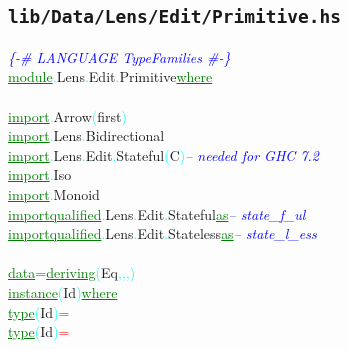 \subsection{\texttt{lib/Data/Lens/Edit/Primitive.hs}}
\label{mod:Data.Lens.Edit.Primitive}
\textcolor{blue}{{\it{}\{-\# LANGUAGE TypeFamilies \#-\}}}\\\textcolor{green}{\underline{module}}\textcolor{cyan}{.}{\rm{}Lens}\textcolor{cyan}{.}{\rm{}Edit}\textcolor{cyan}{.}{\rm{}Primitive}\hsspace \textcolor{green}{\underline{where}}\\\\\textcolor{green}{\underline{import}}\textcolor{cyan}{.}{\rm{}Arrow}\hsspace \textcolor{cyan}{(}{\rm{}first}\textcolor{cyan}{)}\\\textcolor{green}{\underline{import}}\textcolor{cyan}{.}{\rm{}Lens}\textcolor{cyan}{.}{\rm{}Bidirectional}\\\textcolor{green}{\underline{import}}\textcolor{cyan}{.}{\rm{}Lens}\textcolor{cyan}{.}{\rm{}Edit}\textcolor{cyan}{.}{\rm{}Stateful}\hsspace \textcolor{cyan}{(}{\rm{}C}\textcolor{cyan}{)}\hsspace \textcolor{blue}{{\it{}-- needed for GHC 7.2}}\\\textcolor{green}{\underline{import}}\textcolor{cyan}{.}{\rm{}Iso}\\\textcolor{green}{\underline{import}}\textcolor{cyan}{.}{\rm{}Monoid}\\\textcolor{green}{\underline{import}}\hsspace \textcolor{green}{\underline{qualified}}\textcolor{cyan}{.}{\rm{}Lens}\textcolor{cyan}{.}{\rm{}Edit}\textcolor{cyan}{.}{\rm{}Stateful}\hsspace \hsspace \textcolor{green}{\underline{as}}\hsspace \textcolor{blue}{{\it{}-- state\_f\_ul}}\\\textcolor{green}{\underline{import}}\hsspace \textcolor{green}{\underline{qualified}}\textcolor{cyan}{.}{\rm{}Lens}\textcolor{cyan}{.}{\rm{}Edit}\textcolor{cyan}{.}{\rm{}Stateless}\hsspace \textcolor{green}{\underline{as}}\hsspace \textcolor{blue}{{\it{}-- state\_l\_ess}}\\\\\textcolor{green}{\underline{data}}\hsspace \textcolor{red}{=}\hsspace \textcolor{green}{\underline{deriving}}\hsspace \textcolor{cyan}{(}{\rm{}Eq}\textcolor{cyan}{,}\textcolor{cyan}{,}\textcolor{cyan}{,}\textcolor{cyan}{)}\\\textcolor{green}{\underline{instance}}\hsspace \textcolor{cyan}{(}{\rm{}Id}\textcolor{cyan}{)}\hsspace \textcolor{green}{\underline{where}}\\\hstab \textcolor{green}{\underline{type}}\hsspace \textcolor{cyan}{(}{\rm{}Id}\textcolor{cyan}{)}\hsspace \textcolor{red}{=}\\\hstab \textcolor{green}{\underline{type}}\hsspace \textcolor{cyan}{(}{\rm{}Id}\textcolor{cyan}{)}\hsspace \textcolor{red}{=}\hsspace 